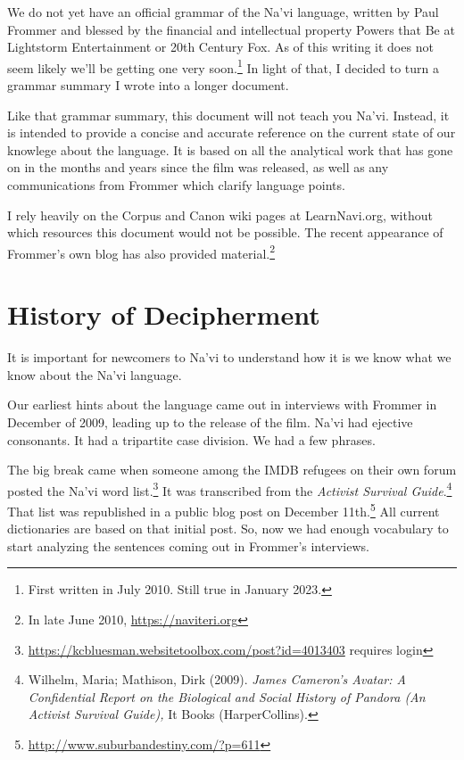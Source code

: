 
We do not yet have an official grammar of the Na'vi language, written
by Paul Frommer and blessed by the financial and intellectual property
Powers that Be at Lightstorm Entertainment or 20th Century Fox.  As of
this writing it does not seem likely we'll be getting one very
soon.\footnote{First written in July 2010.  Still true in January
2023.} In light of that, I decided to turn a grammar summary I wrote
into a longer document.

Like that grammar summary, this document will not teach you Na'vi.
Instead, it is intended to provide a concise and accurate reference on
the current state of our knowlege about the language.  It is based on
all the analytical work that has gone on in the months and years since
the film was released, as well as any communications from Frommer
which clarify language points.

I rely heavily on the Corpus and Canon wiki pages at LearnNavi.org,
without which resources this document would not be possible.  The
recent appearance of Frommer's own blog has also provided
material.\footnote{In late June 2010, \url{https://naviteri.org}}


\section{History of Decipherment}
It is important for newcomers to Na'vi to understand how it is we know
what we know about the Na'vi language.

Our earliest hints about the language came out in interviews with
Frommer in December of 2009, leading up to the release of the film.
Na'vi had ejective consonants.  It had a tripartite case division.  We
had a few phrases.

The big break came when someone among the IMDB refugees on their own
forum posted the Na'vi word
list.\footnote{\url{https://kcbluesman.websitetoolbox.com/post?id=4013403}
requires login}  It was transcribed from the \textit{Activist
Survival Guide}.\footnote{Wilhelm, Maria; Mathison, Dirk (2009). \textit{James
Cameron's Avatar: A Confidential Report on the Biological and Social
History of Pandora (An Activist Survival Guide),} It Books (HarperCollins).}
That list was republished in a public blog post on December
11th.\footnote{\url{http://www.suburbandestiny.com/?p=611}} All
current dictionaries are based on that initial post.  So, now we had
enough vocabulary to start analyzing the sentences coming out in
Frommer's interviews.


